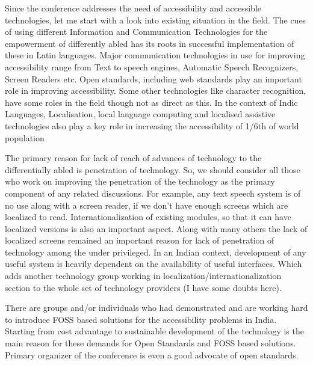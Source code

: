 ﻿
\vskip 2pt


Since the conference addresses the need of accessibility and accessible technologies, let me start with a look into existing situation in the field. The cues of using different Information and Communication Technologies for the empowerment of differently abled has its roots in successful implementation of these in Latin languages. Major communication technologies in use for improving accessibility range from Text to speech engines, Automatic Speech Recognizers, Screen Readers etc. Open standards, including web standards play an important role in improving accessibility. Some other technologies like character recognition, have some roles in the field though not as direct as this. In the context of Indic Languages, Localisation, local language computing and localised assistive technologies also play a key role in increasing the accessibility of 1/6th of world population

The primary reason for lack of reach of advances of technology to the differentially abled is penetration of technology. So, we should consider all those who work on improving the penetration of the technology as the primary component of any related discussions. For example, any text speech system is of no use along with a screen reader, if we don't have enough screens which are localized to read. Internationalization of existing modules, so that it can have localized versions is also an important aspect. Along with many others the lack of localized screens remained an important reason for lack of penetration of technology among the under privileged. In an Indian context, development of any useful system is heavily dependent on the availability of useful interfaces. Which adds another technology group working in localization/internationalization section to the whole set of technology providers (I have some doubts here). 

There are groups and/or individuals who had demonstrated and are working hard to introduce FOSS based solutions for the accessibility problems in India. Starting from cost advantage to sustainable development of the technology is the main reason for these demands for Open Standards and FOSS based solutions. Primary organizer of the conference is even a good advocate of open standards. 

